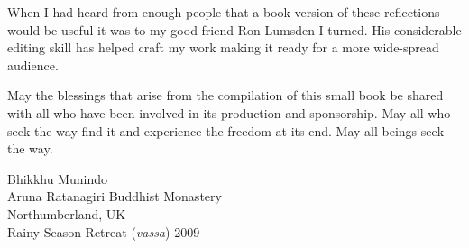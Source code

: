 When I had heard from enough people that a book version of these
reflections would be useful it was to my good friend Ron Lumsden I
turned. His considerable editing skill has helped craft my work making
it ready for a more wide-spread audience.

May the blessings that arise from the compilation of this small book be
shared with all who have been involved in its production and
sponsorship.  May all who seek the way find it and experience the
freedom at its end. May all beings seek the way.

{\par\raggedleft
Bhikkhu Munindo\\
Aruna Ratanagiri Buddhist Monastery\\
Northumberland, UK\\
Rainy Season Retreat (\emph{vassa}) 2009
\par}


